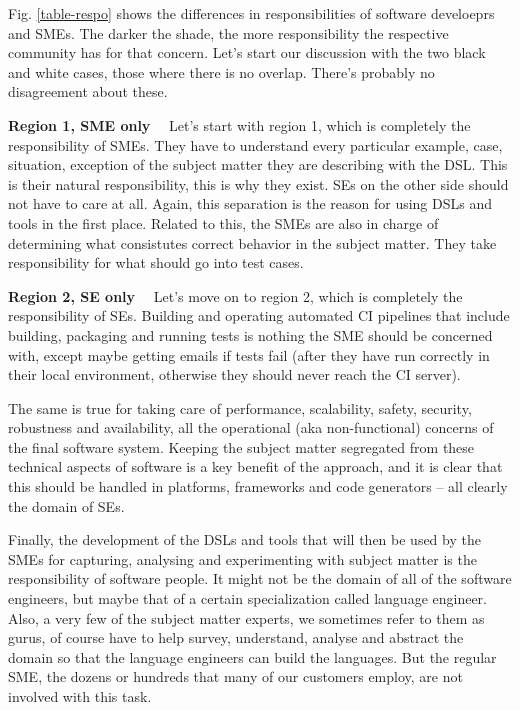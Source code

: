 \documentclass[runningheads]{llncs}
\newcommand\parhead[1]{\vspace{1mm}\noindent\textbf{{#1}}\ \ }
\newcommand{\fig}[1]{Fig. \ref{#1}}  %
\begin{document}
\fig{table-respo} shows the differences in responsibilities of software
develoeprs and SMEs. The darker the shade, the more responsibility the
respective community has for that concern. Let's start our discussion
with the two black and white cases, those where there is no overlap.
There's probably no disagreement about these.

\parhead{Region 1, SME only} Let's start with region 1, which is completely the
responsibility of SMEs. They have to understand every particular example, case,
situation, exception of the subject matter they are describing with the DSL.
This is their natural responsibility, this is why they exist. SEs on the other
side should not have to care at all. Again, this separation is the reason for
using DSLs and tools in the first place. Related to this, the SMEs are also in
charge of determining what consistutes correct behavior in the subject matter.
They take responsibility for what should go into test cases.

\parhead{Region 2, SE only} Let's move on to region 2, which is completely the
responsibility of SEs.
Building and operating automated CI pipelines that include building, packaging
and running tests is nothing the SME should be concerned with, except maybe
getting emails if tests fail (after they have run correctly in their local
environment, otherwise they should never reach the CI server).
 
The same is true for taking care of performance, scalability, 
safety, security, robustness and availability, all the operational
(aka non-functional) concerns of the final software system. Keeping the
subject matter segregated from these technical aspects of software is
a key benefit of the approach, and it is clear that this should be 
handled in platforms, frameworks and code generators -- all clearly
the domain of SEs.

Finally, the development of the DSLs and tools that will then be used
by the SMEs for capturing, analysing and experimenting with subject matter
is the responsibility of software people. It might not be the domain of
all of the software engineers, but maybe that of a certain specialization
called language engineer. Also, a very few of the subject matter experts,
we sometimes refer to them as gurus, of course have to help survey,
understand, analyse and abstract the domain so that the language engineers
can build the languages. But the regular SME, the dozens or hundreds
that many of our customers employ, are not involved with this task.
\end{document}
